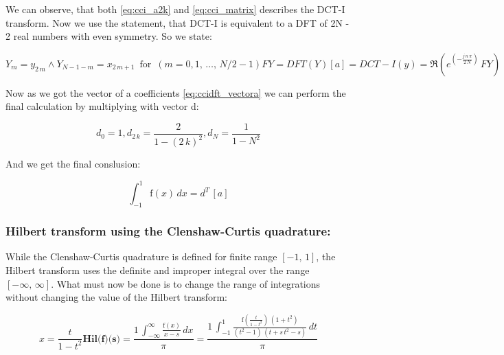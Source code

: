 \documentclass[12pt,twoside,a4paper]{article}
\numberwithin{equation}{subsection}
\numberwithin{figure}{subsection}
\begin{document}
We can observe, that both \ref{eq:cci_a2k} and \ref{eq:cci_matrix} describes the DCT-I transform. Now we use the statement, that
DCT-I is equivalent to a DFT of 2N - 2 real numbers with even symmetry. So we state:

\begin{subequations} \label{eq:cci_dft}
  \begin{equation}   \label{eq:ccidft_ym}
    {Y_{m}}={y_{2\,m}} \wedge {Y_{N - 1 - m}}={x_{2\,m + 1}}\,\mbox{ for }\, (m = 0, 1,\, \ldots,\,N/2-1)  
  \end{equation}
  \begin{equation}   \label{eq:ccidft_fy}
    FY = DFT(Y)
  \end{equation}
  \begin{equation}   \label{eq:ccidft_vectora}
    [a] = DCT-I(y) = \Re (e^{( - \frac {j\,n\,\pi }{2\,N})}\,FY)
  \end{equation}
\end{subequations} 

Now as we got the vector of a coefficients \ref{eq:ccidft_vectora} we can perform the final calculation by multiplying with vector
d:

\begin{equation} \label{eq:cci_vectord}
  {d_{0}} = 1, {d_{2\,k}}=\frac {2}{1 - (2\,k)^{2}}, {d_{N}}=\frac {1}{1 - N^{2}} 
\end{equation} 

And we get the final conslusion:

\begin{equation}
  \int_{ - 1}^{1}\mathrm{f}(x)\,dx=d^{T}\,[a]
\end{equation}

\subsubsection*{Hilbert transform using the Clenshaw-Curtis quadrature:}

While the Clenshaw-Curtis quadrature is defined for finite range $[-1,\,1]$, the Hilbert transform uses the definite and improper
integral over the range $[-\infty,\, \infty]$. What must now be done is to change the range of integrations without changing the
value of the Hilbert transform:

\begin{subequations} \label{eq:cci_range}
  \begin{equation}   \label{eq:ccirange_x}
    x = \frac {t}{1 - t^{2}}
  \end{equation}
  \begin{equation}   \label{eq:ccirange_hil}
    \textbf{Hil(f)(s)} = \frac {1\,\int_{ - \infty }^{\infty }\frac {\mathrm{f}(x)}{x - s}\,dx}{\pi } = \frac {1\,\int_{ -
    1}^{1}\frac {\mathrm{f}(\frac {t}{1 - t^{2}})\,(1 + t^{2})}{(t^{2} - 1)\,(t + s\,t^{2} - s)}\,dt}{\pi }
  \end{equation}
\end{subequations}
   
\end{document}
